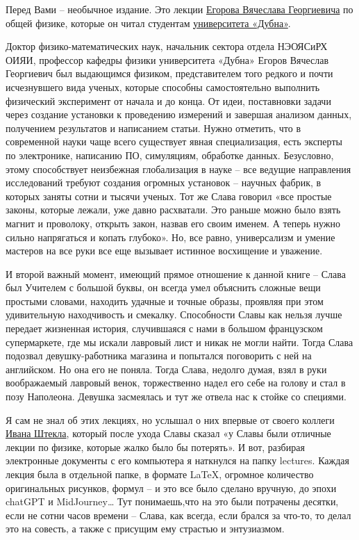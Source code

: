 Перед Вами – необычное издание. Это лекции \href{https://dlnp.jinr.ru/news/618}{Егорова Вячеслава Георгиевича} по общей физике, которые он читал студентам \href{https://www.uni-dubna.ru/}{университета «Дубна»}.

Доктор физико-математических наук, начальник сектора отдела НЭОЯСиРХ ОИЯИ, профессор кафедры физики университета «Дубна» Егоров Вячеслав Георгиевич был выдающимся физиком, представителем того редкого и почти исчезнувшего вида ученых, которые способны самостоятельно выполнить физический эксперимент от начала и до конца. От идеи, поставновки задачи через создание установки к проведению измерений и завершая анализом данных, получением результатов и написанием статьи. Нужно отметить, что в современной науки чаще всего существует явная специализация, есть эксперты по электронике, написанию ПО, симуляциям, обработке данных. Безусловно, этому способствует неизбежная глобализация в науке – все ведущие направления исследований требуют создания огромных установок – научных фабрик, в которых заняты сотни и тысячи ученых. Тот же Слава говорил «все простые законы, которые лежали, уже давно расхватали. Это раньше можно было взять магнит и проволоку, открыть закон, назвав его своим именем. А теперь нужно сильно напрягаться и копать глубоко». Но, все равно, универсализм и умение мастеров на все руки все еще вызывает истинное восхищение и уважение.

И второй важный момент, имеющий прямое отношение к данной книге – Слава был Учителем с большой буквы, он всегда умел объяснить сложные вещи простыми словами, находить удачные и точные образы, проявляя при этом удивительную находчивость и смекалку. Способности Славы как нельзя лучше передает жизненная история, случившаяся с нами в большом французском супермаркете, где мы искали лавровый лист и никак не могли найти. Тогда Слава подозвал девушку-работника магазина и попытался поговорить с ней на английском. Но она его не поняла. Тогда Слава, недолго думая, взял в руки воображаемый лавровый венок, торжественно надел его себе на голову и стал в позу Наполеона. Девушка засмеялась и тут же отвела нас к стойке со специями.

Я сам не знал об этих лекциях, но услышал о них впервые от своего коллеги \href{https://www.utef.cvut.cz/staff/00078/ivan-stekl}{Ивана Штекла}, который после ухода Славы сказал «у Славы были отличные лекции по физике, которые жалко было бы потерять». И вот, разбирая электронные документы с его компьютера я наткнулся на папку lectures. Каждая лекция была в отдельной папке, в формате LaTeX, огромное количество оригинальных рисунков, формул – и это все было сделано вручную, до эпохи chatGPT и MidJourney… Тут понимаешь,что на это были потрачены десятки, если не сотни часов времени – Слава, как всегда, если брался за что-то, то делал это на совесть, а также с присущим ему страстью и энтузиазмом.

